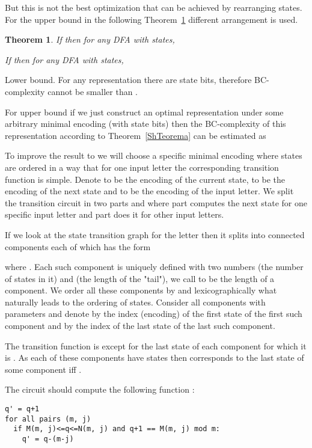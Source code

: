 \documentclass[copyright, creativecommons]{eptcs}
\newtheorem{theorem}{Theorem}[section]
\newenvironment{proof}[1][Proof]{\begin{trivlist}
\item[\hskip \labelsep {\bfseries #1}]}{\end{trivlist}}
\begin{document}
But this is not the best optimization that can be achieved by rearranging states.
For the upper bound in the following Theorem~\ref{PFrobezas} different arrangement is used.

\begin{theorem}
\label{PFrobezas}
If  then for any DFA  with  states, 

If  then for any DFA  with  states, 


\end{theorem}
\begin{proof}
Lower bound. For any representation  there are  state bits,
therefore BC-complexity cannot be smaller than .

For upper bound if we just construct an optimal representation  under
some arbitrary minimal encoding (with  state bits)
then the BC-complexity of this representation according to Theorem~\ref{ShTeorema} can be estimated as


To improve the result to  we will choose a specific minimal encoding where states are ordered in
a way that for one input letter the corresponding transition function is simple.
Denote  to be the encoding of the current state,  to be the encoding of the next state and  to be
the encoding of the input letter.
We split the transition circuit  in two parts  and  where part 
computes the next state for one specific input letter  and part  does it for other  input letters.


If we look at the state transition graph for the letter  then it
splits into connected components each of which has the form

where .
Each such component is uniquely defined with two numbers  (the number of states in it) and 
(the length of the "tail"), we call  to be the length of a component.
We order all these components by  and  lexicographically what naturally leads
to the ordering of states. Consider all components with parameters  and denote by  the index (encoding)
of the first state of the first such component and by  the index of the last state of the last such component.

The transition function is  except for the last state  of each component
for which it is . As each of these components have  states then 
corresponds to the last state of some component iff .

The circuit  should compute the following function :
\begin{verbatim}
q' = q+1
for all pairs (m, j)
  if M(m, j)<=q<=N(m, j) and q+1 == M(m, j) mod m:
    q' = q-(m-j)
\end{verbatim}


\end{proof}
\end{document}
